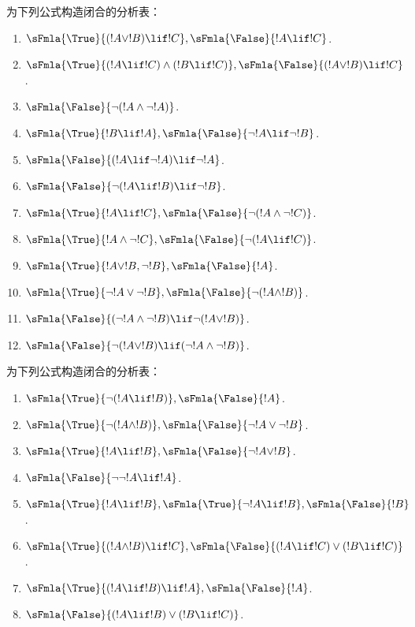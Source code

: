 \documentclass[../../../include/open-logic-section]{subfiles}
\begin{document}
\begin{prob}
为下列公式构造闭合的分析表：
\begin{enumerate}
\item $\sFmla{\True}{(!A \lor !B) \lif !C}, \sFmla{\False}{!A \lif !C}$.
\item $\sFmla{\True}{(!A \lif !C) \land (!B \lif !C)}, \sFmla{\False}{(!A \lor !B) \lif !C}$.
\item $\sFmla{\False}{\lnot(!A \land \lnot !A)}$.
\item $\sFmla{\True}{!B \lif !A}, \sFmla{\False}{\lnot !A \lif \lnot !B}$.
\item $\sFmla{\False}{(!A \lif \lnot !A) \lif \lnot !A}$.
\item $\sFmla{\False}{\lnot(!A \lif !B) \lif \lnot !B}$.
\item $\sFmla{\True}{!A \lif !C}, \sFmla{\False}{\lnot (!A \land \lnot !C)}$.
\item $\sFmla{\True}{!A \land \lnot !C}, \sFmla{\False}{\lnot (!A \lif !C)}$.
\item $\sFmla{\True}{!A \lor !B, \lnot !B}, \sFmla{\False}{!A}$.
\item $\sFmla{\True}{\lnot !A \lor \lnot !B}, \sFmla{\False}{\lnot(!A \land !B)}$.
\item $\sFmla{\False}{(\lnot !A \land \lnot !B) \lif\lnot(!A \lor !B)}$.
\item $\sFmla{\False}{\lnot(!A \lor !B) \lif (\lnot !A \land \lnot !B)}$.
\end{enumerate}
\end{prob}

\begin{prob}
为下列公式构造闭合的分析表：
\begin{enumerate}
\item $\sFmla{\True}{\lnot(!A \lif !B)}, \sFmla{\False}{!A}$.
\item $\sFmla{\True}{\lnot(!A \land !B)}, \sFmla{\False}{\lnot !A \lor \lnot !B}$.
\item $\sFmla{\True}{!A \lif !B}, \sFmla{\False}{\lnot !A \lor !B}$.
\item $\sFmla{\False}{\lnot \lnot !A \lif !A}$.
\item $\sFmla{\True}{!A \lif !B}, \sFmla{\True}{\lnot !A \lif !B}, \sFmla{\False}{!B}$.
\item $\sFmla{\True}{(!A \land !B) \lif !C}, \sFmla{\False}{(!A \lif !C) \lor (!B \lif !C)}$.
\item $\sFmla{\True}{(!A \lif !B) \lif !A}, \sFmla{\False}{!A}$.
\item $\sFmla{\False}{(!A \lif !B) \lor (!B \lif !C)}$.
\end{enumerate}
\end{prob}
\end{document}
